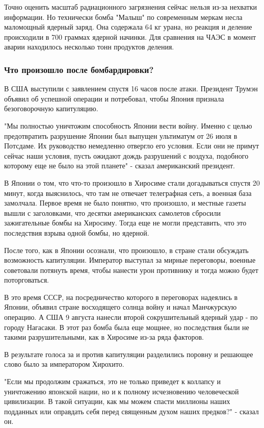 Точно оценить масштаб радиационного загрязнения сейчас нельзя из-за нехватки
информации. Но технически бомба "Малыш" по современным меркам несла маломощный
ядерный заряд. Она содержала 64 кг урана, но реакция и деление происходили в
700 граммах ядерной начинки. Для сравнения на ЧАЭС в момент аварии находилось
несколько тонн продуктов деления.

\subsubsection{Что произошло после бомбардировки?}

В США выступили с заявлением спустя 16 часов после атаки. Президент Трумэн объявил об успешной операции и потребовал, чтобы Япония признала безоговорочную капитуляцию.

"Мы полностью уничтожим способность Японии вести войну. Именно с целью предотвратить разрушение Японии был выпущен ультиматум от 26 июля в Потсдаме. Их руководство немедленно отвергло его условия. Если они не примут сейчас наши условия, пусть ожидают дождь разрушений с воздуха, подобного которому еще не было на этой планете" - сказал американский президент.

В Японии о том, что что-то произошло в Хиросиме стали догадываться спустя 20 минут, когда выяснилось, что там не отвечает телеграфная сеть, а военная база замолчала. Первое время не было понятно, что произошло, и местные газеты вышли с заголовками, что десятки американских самолетов сбросили зажигательные бомбы на Хиросиму. Тогда еще не могли представить, что это последствия взрыва одной бомбы, но ядерной.

После того, как в Японии осознали, что произошло, в стране стали обсуждать возможность  капитуляции. Император выступал за мирные переговоры, военные советовали потянуть время, чтобы нанести урон противнику и тогда можно будет поторговаться. 

В это время СССР, на посредничество которого в переговорах надеялись в Японии,
объявил стране восходящего солнца войну и начал Манчжурскую операцию. А США 9
августа нанесли второй сокрушительный ядерный удар - по городу Нагасаки. В этот
раз бомба была еще мощнее, но последствия были не такими разрушительными, как в
Хиросиме из-за ряда факторов.

В результате голоса за и против капитуляции разделились поровну и решающее слово было за императором Хирохито.

"Если мы продолжим сражаться, это не только приведет к коллапсу и уничтожению японской нации, но и к полному исчезновению человеческой цивилизации. В такой ситуации, как мы можем спасти миллионы наших подданных или оправдать себя перед священным духом наших предков?" - сказал он.

